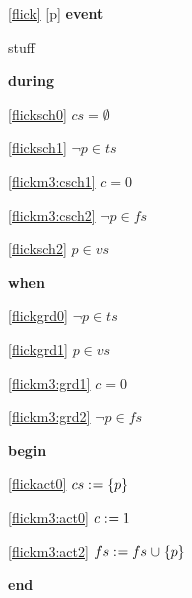 \noindent \ref{flick} [p] \textbf{event}
  \item   \begin{block}
    \item   stuff
  \end{block}
\begin{block}
  \item   \textbf{during}
  \begin{block}
  \item[ \eqref{flicksch0} ]\sout{$cs = \emptyset $} %
  \item[ \eqref{flicksch1} ]\sout{$\neg p \in ts $} %
  \end{block}
  \begin{block}
  \item[ \eqref{flickm3:csch1} ]{$c = 0 $} %
  \item[ \eqref{flickm3:csch2} ]{$\neg p \in fs $} %
  \item[ \eqref{flicksch2} ]{$p \in vs$} %
  \end{block}
  \item   \textbf{when}
  \begin{block}
  \item[ \eqref{flickgrd0} ]\sout{$\neg p \in ts $} %
  \end{block}
  \begin{block}
  \item[ \eqref{flickgrd1} ]{$p \in vs$} %
  \item[ \eqref{flickm3:grd1} ]{$c = 0 $} %
  \item[ \eqref{flickm3:grd2} ]{$\neg p \in fs $} %
  \end{block}
  \item   \textbf{begin}
  \begin{block}
  \item[ \eqref{flickact0} ]\sout{$cs \mathrel{:\mkern1mu=} \{ p \} $} %
  \end{block}
  \begin{block}
  \item[ \eqref{flickm3:act0} ]{$c \mathrel{:\mkern1mu=} 1$} %
  \item[ \eqref{flickm3:act2} ]{$fs \mathrel{:\mkern1mu=} fs \mathbin{\mkern1mu\cup\mkern1mu} \{ p \} $} %
  \end{block}
  \item   \textbf{end} \\
\end{block}
